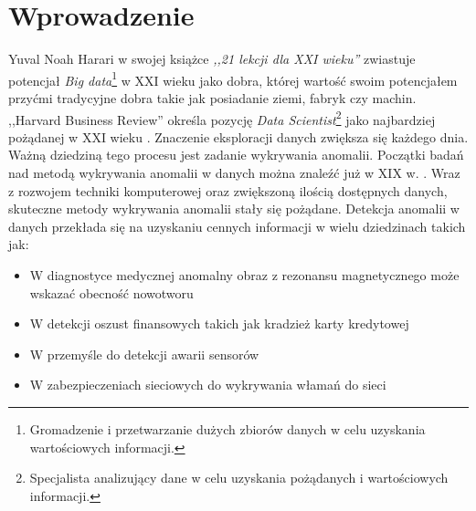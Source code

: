 \section{Wprowadzenie}
\label{sec:wprowadzenie}

Yuval Noah Harari w swojej książce \textit{,,21 lekcji dla XXI wieku''} zwiastuje potencjał \textit{Big data}\footnote{Gromadzenie i przetwarzanie dużych zbiorów danych w celu uzyskania wartościowych informacji.} w XXI wieku jako dobra, której wartość swoim potencjałem przyćmi tradycyjne dobra takie jak posiadanie ziemi, fabryk czy machin.
,,Harvard Business Review'' określa pozycję \textit{Data Scientist}\footnote{Specjalista analizujący dane w celu uzyskania pożądanych i wartościowych informacji.} jako najbardziej pożądanej w XXI wieku \cite{davenport2012data}. Znaczenie eksploracji danych zwiększa się każdego dnia.
Ważną dziedziną tego procesu jest zadanie wykrywania anomalii. Początki badań nad metodą wykrywania anomalii w danych można znaleźć już w XIX w. \cite{edgeworth1887xli}. 
Wraz z rozwojem techniki komputerowej oraz zwiększoną ilością dostępnych danych, skuteczne metody wykrywania anomalii stały się pożądane. 
Detekcja anomalii w danych przekłada się na uzyskaniu cennych informacji w wielu dziedzinach takich jak:
\begin{itemize}
    \item W diagnostyce medycznej anomalny obraz z rezonansu magnetycznego może wskazać obecność nowotworu \cite{spence2001detection}
    \item W detekcji oszust finansowych takich jak kradzież karty kredytowej \cite{bolton2001unsupervised}
    \item W przemyśle do detekcji awarii sensorów \cite{dereszynski2011spatiotemporal} 
    \item W zabezpieczeniach sieciowych do wykrywania włamań do sieci \cite{garcia2009anomaly}
\end{itemize} 

